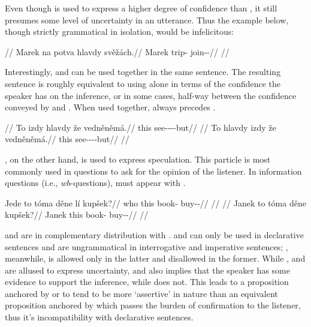 Even though  is used to express a higher degree of confidence than
, it still presumes some level of uncertainty in an utterance. Thus
the example below, though strictly grammatical in isolation, would be
infelicitous:

\pex
\begingl
	\glpreamble {}//
	\gla \ljudge{\#}Marek na potva hlavdy svěžách.//
	\glb Marek \Loc{} trip-\Acc{} \Infer{} join-\Av{}-\Ctp{}//
	\glft {}//
\endgl
\xe

Interestingly,  and  can be used together in the same
sentence. The resulting sentence is roughly equivalent to using  alone
in terms of the confidence the speaker has on the inference, or in some cases,
half-way between the confidence conveyed by  and . When
used together,  always precedes .

\pex
\a
\begingl
	\glpreamble {}//
	\gla To izdy hlavdy že vedněněmá.//
	\glb this \Infer{} \Infer{} \Pfv{} see-\Pv{}-\Ret{}-\Cnj{}-but//
	\glft {}//
\endgl
\a
\begingl
	\gla \ljudge{*}To hlavdy izdy že vedněněmá.//
	\glb this \Infer{} \Infer{} \Pfv{} see-\Pv{}-\Ret{}-\Cnj{}-but//
	\glft {}//
\endgl
\xe

, on the other hand, is used to express speculation. This particle is
most commonly used in questions to ask for the opinion of the listener. In
information questions (i.e., \emph{wh}-questions),  must appear with
.

\pex
\a
\begingl
	\gla Jede to tóma děne lí kupšek?//
	\glb who this book-\Acc{} \Spec{} \Q{} buy-\Av{}-\Pf{}//
	\glft {}//
\endgl
\a
\begingl
	//
	\gla Janek to tóma děne kupšek?//
	\glb Janek this book-\Acc{} \Spec{} buy-\Av{}-\Pf{}//
	\glft {}//
\endgl
\xe

 and  are in complementary distribution with .
 and  can only be used in declarative sentences and are
ungrammatical in interrogative and imperative sentences; , meanwhile,
is allowed only in the latter and disallowed in the former. While ,
 and  are  allused to express uncertainty,  and
 also implies that the speaker has some evidence to support the
inference, while  does not. This leads to a proposition anchored by
 or  to tend to be more `assertive' in nature than an
equivalent proposition anchored by  which passes the burden of
confirmation to the listener, thus it's incompatibility with declarative
sentences.

